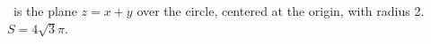 {\surfaceS\ is the plane $z=x+y$ over the circle, centered at the origin, with radius 2.
}
{$S = 4\sqrt{3}\pi$.
}
